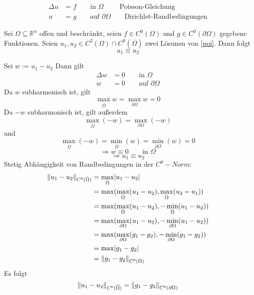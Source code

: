 \begin{align}\label{poi}\tag{p}
	\Delta u &= f \qquad \text{in }\Omega \qquad \text{  Poisson-Gleichung}\\
	u&=g \qquad \text{auf }\partial \Omega \qquad \text{Dirichlet-Randbedingungen}
 \end{align}

\begin{korollar}
	Sei $\Omega \subseteq \mathbb{R}^n$ offen und beschränkt, seien $f \in C^0(\Omega)$ und $g \in C^0(\partial \Omega)$ gegebene Funktionen. Seien $u_1,u_2 \in C^2(\Omega)\cap C^0(\overline{\Omega})$ zwei Lösunen von \eqref{poi}. Dann folgt
	\begin{equation}
		u_1 \equiv u_2
	\end{equation}
\end{korollar}
\begin{beweis}
	Sei $w := u_1 - u_2$ Dann gilt
	\begin{align}
		\Delta w &= 0 \qquad \text{in }\Omega \\
		w &= 0 \qquad \text{auf }\partial \Omega
	\end{align}
	Da $w$ subharmonisch ist, gilt
	\begin{equation}
		\max_{\bar{\Omega}} w = \max_{\partial \Omega} w = 0
	\end{equation}
	Da $-w$ subharmonisch ist, gilt außerdem
	\begin{equation} 
		\max_{\bar{\Omega}}(-w) = \max_{\partial \Omega}(-w)
	\end{equation}
	und \begin{equation}
		\max_{\bar{\Omega}}(-w) = \min_{\bar{\Omega}}(w) = \min_{\partial \Omega}(w) = 0
	\end{equation}
	\begin{equation}
		\Rightarrow w \equiv 0 \qquad \text{in }\Omega 
	\end{equation}
	\[
		\Rightarrow u_1 \equiv u_2
	\]
Stetig Abhängigkeit von Randbedingungen in der $C^0-Norm$:
\begin{align*}
	\norm{u_1-u_2}_{C^0(\bar{\Omega})} &= \max_{\bar{\Omega}} \abs{u_1-u_2} \\
	&= \max( \max_{\bar{\Omega}} (u_1-u_2), \max_{\bar{\Omega}}(u_2-u_1) ) \\
	&= \max( \max_{\bar{\Omega}} (u_1-u_2), -\min_{\bar{\Omega}}(u_1-u_2) ) \\
	&= \max( \max_{\partial \Omega} (u_1-u_2), -\min_{\partial \Omega}(u_1-u_2) ) \\
	&= \max( \max_{\partial \Omega} (g_1-g_2), -\min_{\partial \Omega}(g_1-g_2) ) \\
	&= \max \abs{g_1-g_2} \\
	&= \norm{g_1-g_2}_{C^0(\Omega)}
\end{align*}
Es folgt
\[
	\norm{u_1-u_2}_{C^0(\overline{\Omega})} = \norm{g_1-g_2}_{C^0(\partial \Omega)}
\]
\end{beweis}

